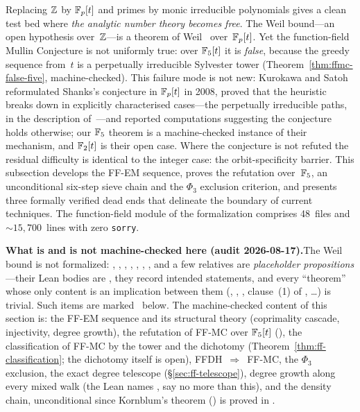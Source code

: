 \begin{roadmap}
Replacing $\mathbb{Z}$ by $\mathbb{F}_p[t]$ and primes by monic irreducible polynomials
gives a clean test bed where \emph{the analytic number theory becomes
free}.  The Weil bound---an open hypothesis over~$\mathbb{Z}$---is a theorem of
Weil~\cite{Weil1948} over~$\mathbb{F}_p[t]$.  Yet the function-field Mullin
Conjecture is not uniformly true: over $\mathbb{F}_5[t]$ it is \emph{false},
because the greedy sequence from~$t$ is a perpetually irreducible
Sylvester tower (Theorem~\ref{thm:ffmc-false-five}, machine-checked).
This failure mode is not new: Kurokawa and Satoh~\cite{KuSa2008}
reformulated Shanks's conjecture in $\mathbb{F}_p[t]$ in 2008, proved that the
heuristic breaks down in explicitly characterised cases---the perpetually
irreducible paths, in the description of~\cite{BoIr2016}---and reported
computations suggesting the conjecture holds otherwise; our $\mathbb{F}_5$
theorem is a machine-checked instance of their mechanism, and
$\mathbb{F}_2[t]$ is their open case.  Where the conjecture is not refuted the
residual difficulty is identical to the integer case: the
orbit-specificity barrier.  This subsection develops
the FF-EM sequence, proves the refutation over~$\mathbb{F}_5$, an unconditional
six-step sieve chain and the $\Phi_3$ exclusion criterion, and presents
three formally verified dead ends that delineate the boundary of current
techniques.  The function-field module of the formalization comprises
48~files and ${\sim}15{,}700$~lines with zero \texttt{sorry}.

\medskip\noindent\textbf{What is and is not machine-checked here (audit
2026-08-17).}\enspace The Weil bound is not formalized: ,
, ,
, , ,
,  and a few relatives are
\emph{placeholder propositions}---their Lean bodies are , they
record intended statements, and every ``theorem'' whose only content is
an implication between them (,
,
, clause~(1) of
, \dots) is trivial.  Such items are
marked \placeholder\ below.  The machine-checked content of this
section is: the FF-EM sequence and its structural theory (coprimality
cascade, injectivity, degree growth), the refutation of FF-MC over
$\mathbb{F}_5[t]$ (),
the classification of FF-MC by the tower and the dichotomy
(Theorem~\ref{thm:ff-classification}; the dichotomy itself is open),
FFDH~$\Rightarrow$~FF-MC, the $\Phi_3$ exclusion, the exact degree telescope
(\S\ref{sec:ff-telescope}), degree growth along every mixed walk (the
Lean names ,  say no more
than this), and the density chain, unconditional since Kornblum's theorem
() is proved in .
\end{roadmap}

